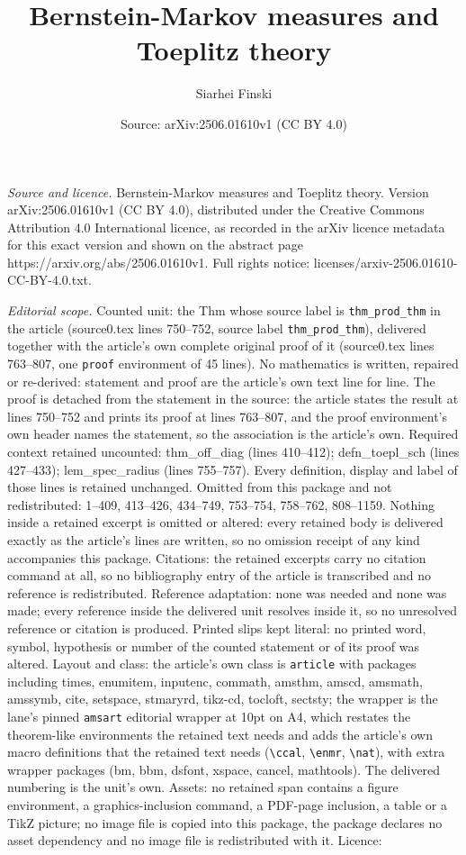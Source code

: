 \documentclass[10pt,a4paper]{amsart}
\title[Bernstein-Markov measures and Toeplitz theory]{Bernstein-Markov measures and Toeplitz theory}
\author{Siarhei Finski}
\date{Source: arXiv:2506.01610v1 (CC BY 4.0)}
\begin{document}
\maketitle

\noindent\emph{Source and licence.} Bernstein-Markov measures and Toeplitz theory. Version arXiv:2506.01610v1 (CC BY 4.0), distributed under the Creative Commons Attribution 4.0 International licence, as recorded in the arXiv licence metadata for this exact version and shown on the abstract page https://arxiv.org/abs/2506.01610v1. Full rights notice: licenses/arxiv-2506.01610-CC-BY-4.0.txt.\par\smallskip

\noindent\textit{Editorial scope.} Counted unit: the Thm whose source label is \texttt{thm\_prod\_thm} in the article (source0.tex lines 750--752, source label \texttt{thm\_prod\_thm}), delivered together with the article's own complete original proof of it (source0.tex lines 763--807, one \texttt{proof} environment of 45 lines). No mathematics is written, repaired or re-derived: statement and proof are the article's own text line for line. The proof is detached from the statement in the source: the article states the result at lines 750--752 and prints its proof at lines 763--807, and the proof environment's own header names the statement, so the association is the article's own. Required context retained uncounted: thm\_off\_diag (lines 410--412); defn\_toepl\_sch (lines 427--433); lem\_spec\_radius (lines 755--757). Every definition, display and label of those lines is retained unchanged. Omitted from this package and not redistributed: 1--409, 413--426, 434--749, 753--754, 758--762, 808--1159. Nothing inside a retained excerpt is omitted or altered: every retained body is delivered exactly as the article's lines are written, so no omission receipt of any kind accompanies this package. Citations: the retained excerpts carry no citation command at all, so no bibliography entry of the article is transcribed and no reference is redistributed. Reference adaptation: none was needed and none was made; every reference inside the delivered unit resolves inside it, so no unresolved reference or citation is produced. Printed slips kept literal: no printed word, symbol, hypothesis or number of the counted statement or of its proof was altered. Layout and class: the article's own class is \texttt{article} with packages including times, enumitem, inputenc, commath, amsthm, amscd, amsmath, amssymb, cite, setspace, stmaryrd, tikz-cd, tocloft, sectsty; the wrapper is the lane's pinned \texttt{amsart} editorial wrapper at 10pt on A4, which restates the theorem-like environments the retained text needs and adds the article's own macro definitions that the retained text needs (\texttt{\textbackslash ccal}, \texttt{\textbackslash enmr}, \texttt{\textbackslash nat}), with extra wrapper packages (bm, bbm, dsfont, xspace, cancel, mathtools). The delivered numbering is the unit's own. Assets: no retained span contains a figure environment, a graphics-inclusion command, a PDF-page inclusion, a table or a TikZ picture; no image file is copied into this package, the package declares no asset dependency and no image file is redistributed with it. Licence: 
\end{document}
